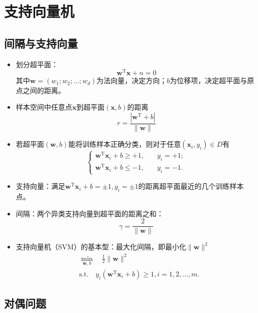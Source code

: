 \documentclass{ctexart}
\begin{document}
			\section{支持向量机}
				\subsection{间隔与支持向量}
					\begin{itemize}
						\item 划分超平面：\[\bm{w}^{\mathrm{T}}\bm{x}+n=0\]其中$\bm{w}=(w_1;w_2;\dots;w_d)$为法向量，决定方向；$b$为位移项，决定超平面与原点之间的距离。
						\item 样本空间中任意点$\bm{x}$到超平面$(\bm{x},b)$的距离\[r=\frac{|\bm{w}^{\mathrm{T}}+b|}{\parallel\bm{w}\parallel}\]
						\item 若超平面$(\bm{w},b)$能将训练样本正确分类，则对于任意$(\bm{x}_i,y_i)\in D$有\[\left\{\begin{aligned}
							\bm{w}^{\mathrm{T}}\bm{x}_i+b\ge+1, & \quad y_i=+1;\\
							\bm{w}^{\mathrm{T}}\bm{x}_i+b\le-1, & \quad y_i=-1.
							\end{aligned}\right.\]
						\item 支持向量：满足$\bm{w}^{\mathrm{T}}\bm{x}_i+b=\pm1,y_i=\pm1$的距离超平面最近的几个训练样本点。
						\item 间隔：两个异类支持向量到超平面的距离之和：\[\gamma=\frac{2}{\parallel\bm{w}\parallel}\]
						\item 支持向量机（SVM）的基本型：最大化间隔，即最小化$\parallel\bm{w}\parallel^2$\begin{align*}
							& \min\limits_{\bm{w},b}\quad\frac{1}{2}\parallel\bm{w}\parallel^2\\
							& \mathrm{s.t.}\quad y_i(\bm{w}^{\mathrm{T}}\bm{x}_i+b)\ge1, i=1,2,\dots,m.
						\end{align*}
					\end{itemize}
				\subsection{对偶问题}
					
\end{document}
